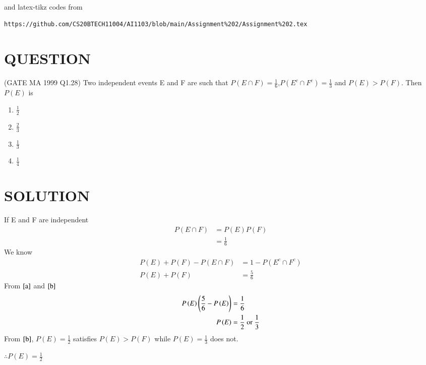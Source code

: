 \documentclass[journal,12pt,twocolumn]{IEEEtran}
\begin{document}
\providecommand{\p}[1]{\ensuremath{P\left(#1\right)}}

and latex-tikz codes from 
%
\begin{lstlisting}
https://github.com/CS20BTECH11004/AI1103/blob/main/Assignment%202/Assignment%202.tex
\end{lstlisting}
\section{QUESTION} 
(GATE MA 1999 Q1.28) Two independent events E and F are such that $\p{E\cap F} = \displaystyle\frac{1}{6}$,$\p{E^c\cap F^c}=\displaystyle\frac{1}{3}$ and $\p{E}>\p{F}$. Then $\p{E}$ is
\begin{enumerate}[label=(\Alph*)]
    \item $\displaystyle\frac{1}{2}$\\
    \item $\displaystyle\frac{2}{3}$\\
    \item $\displaystyle\frac{1}{3}$\\
    \item $\displaystyle\frac{1}{4}$
\end{enumerate}
\section{SOLUTION}
If E and F are independent
\begin{align}
    \p{E\cap F}&=\p{E}\p{F}\nonumber\\
                &=\frac{1}{6}\label{a}
\end{align}
We know
\begin{align}
    \p{E}+\p{F}-\p{E\cap F}&=1-\p{E^c\cap F^c}\nonumber\\
    \p{E}+\p{F}&=\frac{5}{6}\label{b}
\end{align}
From $\eqref{a}$ and $\eqref{b}$
\begin{align}
    \p{E}\brak{\frac{5}{6}-\p{E}}&=\frac{1}{6}\\
    \p{E}&=\frac{1}{2} \text{ or } \frac{1}{3}
\end{align}
From $\eqref{b}$, $\p{E}=\frac{1}{2}$ satisfies $\p{E}>\p{F}$ while  $\p{E}=\frac{1}{3}$ does not.

$\therefore \p{E}=\frac{1}{2}$

\end{document}
